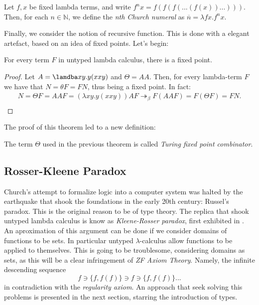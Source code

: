 \begin{definition} \label{def:untyped-natural} 
Let $f,x$ be fixed lambda terms, and write $f^nx = f(f(f(...(f(x))...)))$. Then, for each $n \in \mathbb N$, we define the \emph{nth Church numeral} as $\overline n=\lambda fx.f^nx$.
\end{definition}

Finally, we consider the notion of recursive function. This is done with a elegant artefact, based on an idea of fixed points. Let's begin:



\begin{theorem}
  For every term $F$ in untyped lambda calculus, there is a fixed point.
\end{theorem}
\begin{proof}
  Let $A=\lamdba xy.y(xxy)$ and $\Theta =AA$. Then, for every lambda-term $F$ we have that $N=\theta F = FN$, thus being a fixed point. In fact:
  \begin{align*}
    N = \Theta F = AAF = (\lambda xy.y(xxy))AF \twoheadrightarrow_\beta F(AAF) = F(\Theta F) = FN.\\
  \end{align*}
\end{proof}

The proof of this theorem led to a new definition:

\begin{definition}
  The term $\Theta$ used in the previous theorem is called \emph{Turing fixed point combinator}.
\end{definition}
\subsection{Rosser-Kleene Paradox}

Church's attempt to formalize logic into a computer system was halted by the earthquake that shook the foundations in the early 20th century: Russel's paradox. This is the original  reason to be of type theory. The replica that shook untyped lambda calculus is know as \emph{Kleene-Rosser paradox}, first exhibited in \cite{kleene1935inconsistency}. \\

An aproximation of this argument can be done if we consider domains of functions to be sets. In particular untyped $\lambda$-calculus allow functions to be applied to themselves. This is going to be troublesome, considering domains as sets, as this will be a clear infringement of \emph{ZF Axiom Theory}\cite{kunen2014set}. Namely, the infinite descending sequence
$$f\ni \{f,f(f)\}\ni f \ni \{f,f(f)\}...$$
in contradiction with the \emph{regularity axiom}. An approach that seek solving this problems is presented in the next section, starring the introduction of types.

